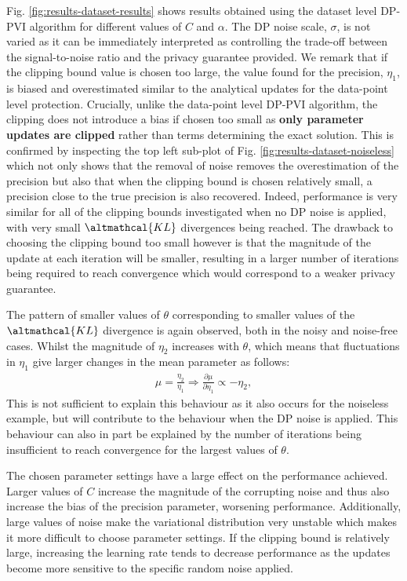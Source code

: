 Fig. \ref{fig:results-dataset-results} shows results obtained using the dataset level DP-PVI algorithm for different values of $C$ and $\alpha$. The DP noise scale, $\sigma$, is not varied as it can be immediately interpreted as controlling the trade-off between the signal-to-noise ratio and the privacy guarantee provided. We remark that if the clipping bound value is chosen too large, the value found for the precision, $\eta_1$, is biased and overestimated similar to the analytical updates for the data-point level protection. Crucially, unlike the data-point level DP-PVI algorithm, the clipping does not introduce a bias if chosen too small as \textbf{only parameter updates are clipped} rather than terms determining the exact solution. This is confirmed by inspecting the top left sub-plot of Fig. \ref{fig:results-dataset-noiseless} which not only shows that the removal of noise removes the overestimation of the precision but also that when the clipping bound is chosen relatively small, a precision close to the true precision is also recovered. Indeed, performance is very similar for all of the clipping bounds investigated when no DP noise is applied, with very small $\altmathcal{KL}$ divergences being reached. The drawback to choosing the clipping bound too small however is that the magnitude of the update at each iteration will be smaller, resulting in a larger number of iterations being required to reach convergence which would correspond to a weaker privacy guarantee.

The pattern of smaller values of $\theta$ corresponding to smaller values of the $\altmathcal{KL}$ divergence is again observed, both in the noisy and noise-free cases. Whilst the magnitude of $\eta_2$ increases with $\theta$, which means that fluctuations in $\eta_1$ give larger changes in the mean parameter as follows:
\begin{align}
\mu = \frac{\eta_2}{\eta_1} \Rightarrow \frac{\partial \mu}{\partial \eta_1} \propto - \eta_2,
\end{align}
This is not sufficient to explain this behaviour as it also occurs for the noiseless example, but will contribute to the behaviour when the DP noise is applied. This behaviour can also in part be explained by the number of iterations being insufficient to reach convergence for the largest values of $\theta$.

The chosen parameter settings have a large effect on the performance achieved. Larger values of $C$ increase the magnitude of the corrupting noise and thus also increase the bias of the precision parameter, worsening performance. Additionally, large values of noise make the variational distribution very unstable which makes it more difficult to choose parameter settings. If the clipping bound is relatively large, increasing the learning rate tends to decrease performance as the updates become more sensitive to the specific random noise applied. 

